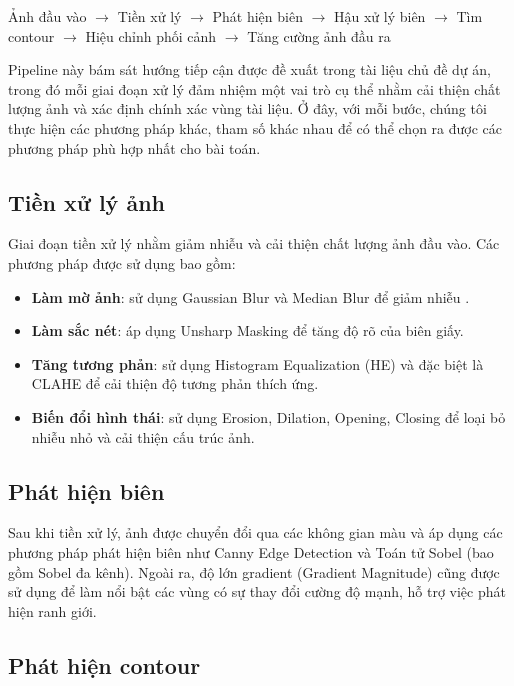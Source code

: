 \documentclass[12pt, a4paper]{report}
\begin{document}
\begin{center}
Ảnh đầu vào $\rightarrow$ Tiền xử lý $\rightarrow$ Phát hiện biên $\rightarrow$ Hậu xử lý biên $\rightarrow$ Tìm contour $\rightarrow$ Hiệu chỉnh phối cảnh $\rightarrow$ Tăng cường ảnh đầu ra
\end{center}

Pipeline này bám sát hướng tiếp cận được đề xuất trong tài liệu chủ đề dự án, trong đó mỗi giai đoạn xử lý đảm nhiệm một vai trò cụ thể nhằm cải thiện chất lượng ảnh và xác định chính xác vùng tài liệu. Ở đây, với mỗi bước, chúng tôi thực hiện các phương pháp khác, tham số khác nhau để có thể chọn ra được các phương pháp phù hợp nhất cho bài toán.

\subsection{Tiền xử lý ảnh}

Giai đoạn tiền xử lý nhằm giảm nhiễu và cải thiện chất lượng ảnh đầu vào. Các phương pháp được sử dụng bao gồm:

\begin{itemize}
    \item \textbf{Làm mờ ảnh}: sử dụng Gaussian Blur và Median Blur để giảm nhiễu \cite{opencv_docs}.
    \item \textbf{Làm sắc nét}: áp dụng Unsharp Masking để tăng độ rõ của biên giấy.
    \item \textbf{Tăng tương phản}: sử dụng Histogram Equalization (HE) và đặc biệt là CLAHE \cite{clahe1994} để cải thiện độ tương phản thích ứng.
    \item \textbf{Biến đổi hình thái}: sử dụng Erosion, Dilation, Opening, Closing \cite{gonzalez2018} để loại bỏ nhiễu nhỏ và cải thiện cấu trúc ảnh.
\end{itemize}

\subsection{Phát hiện biên}

Sau khi tiền xử lý, ảnh được chuyển đổi qua các không gian màu và áp dụng các phương pháp phát hiện biên như Canny Edge Detection \cite{canny1986} và Toán tử Sobel (bao gồm Sobel đa kênh). Ngoài ra, độ lớn gradient (Gradient Magnitude) cũng được sử dụng để làm nổi bật các vùng có sự thay đổi cường độ mạnh, hỗ trợ việc phát hiện ranh giới.

\subsection{Phát hiện contour}
\end{document}

